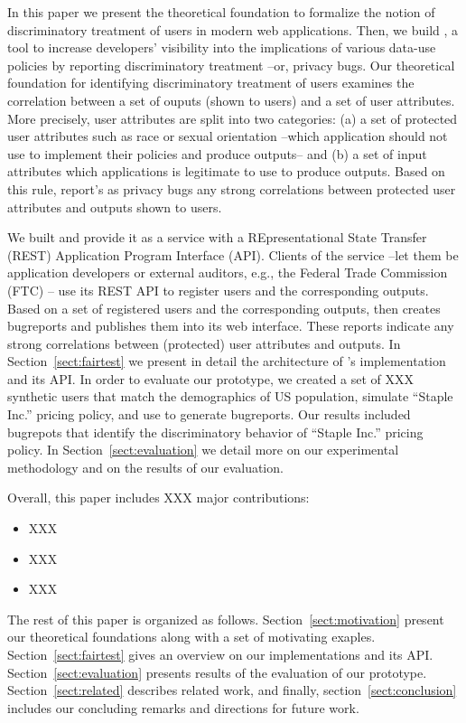 In this paper we present the theoretical foundation to formalize the notion of
discriminatory treatment of users in modern web applications. Then, we build
\sysname, a tool to increase developers’ visibility into the implications of
various data-use policies by reporting discriminatory treatment --or,
privacy bugs. Our theoretical foundation for identifying discriminatory
treatment of users examines the correlation between a set of ouputs (shown to
users) and a set of user attributes. More precisely, user attributes are split
into two categories: (a) a set of protected user attributes such as race or
sexual orientation --which application should not use to implement their
policies and produce outputs-- and (b) a set of input attributes which
applications is legitimate to use to produce outputs. Based on this rule,
\sysname report's as privacy bugs any strong correlations between protected
user attributes and outputs shown to users.

We built \sysname and provide it as a service with a REpresentational
State Transfer (REST) Application Program Interface (API). Clients of the 
\sysname service --let them be application developers or external auditors, e.g.,
the Federal Trade Commission (FTC) -- use its REST API to register users and the
corresponding outputs. Based on a set of registered users and the corresponding
outputs, \sysname then creates bugreports and publishes them into its web interface.
These reports indicate any strong correlations between (protected) user attributes
and outputs. In Section~\ref{sect:fairtest} we present in detail the architecture
of \sysname's implementation and its API. In order to evaluate our \sysname
prototype, we created a set of XXX synthetic users that match the demographics of
US population, simulate ``Staple Inc.'' pricing policy, and use \sysname to generate
bugreports. Our results included bugrepots that identify the discriminatory behavior
of ``Staple  Inc.'' pricing policy. In Section~\ref{sect:evaluation} we detail more
on our experimental methodology and on the results of our evaluation.

Overall, this paper includes XXX major contributions:
\begin{itemize}
  \item XXX 
  \item XXX 
  \item XXX 
\end{itemize}

The rest of this paper is organized as follows. Section~\ref{sect:motivation}
present our theoretical foundations along with a set of motivating exaples.
Section~\ref{sect:fairtest} gives an overview on our \sysname implementations
and its API. Section~\ref{sect:evaluation} presents results of the evaluation of
our \sysname prototype. Section~\ref{sect:related} describes related work, and
finally, section~\ref{sect:conclusion} includes our concluding remarks and
directions for future work.
